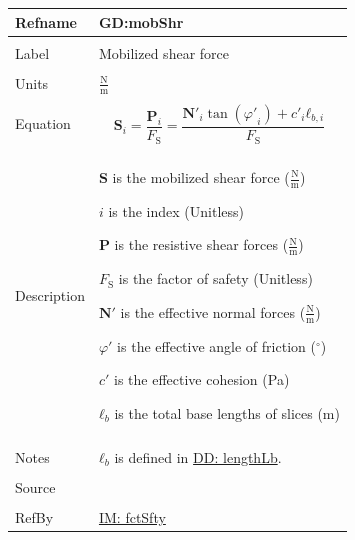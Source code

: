 \documentclass[12pt]{article}
\begin{document}
\noindent \begin{minipage}{\textwidth}
\begin{tabular}{>{\raggedright}p{}>{\raggedright\arraybackslash}p{}}
\toprule \textbf{Refname} & \textbf{GD:mobShr}
\label{GD:mobShr}
\\ \midrule \\
Label & Mobilized shear force
\\ \midrule \\
Units & $\frac{\text{N}}{\text{m}}$
\\ \midrule \\
Equation & \begin{displaymath}
           {\mathbf{S}}_{i}=\frac{{\mathbf{P}}_{i}}{{F_{\text{S}}}}=\frac{{\mathbf{N'}}_{i} \tan\left({φ'}_{i}\right)+{c'}_{i} {\mathbf{ℓ}_{b,i}}}{{F_{\text{S}}}}
           \end{displaymath}
\\ \midrule \\
Description & \begin{symbDescription}
              \item{$\mathbf{S}$ is the mobilized shear force ($\frac{\text{N}}{\text{m}}$)}
              \item{$i$ is the index (Unitless)}
              \item{$\mathbf{P}$ is the resistive shear forces ($\frac{\text{N}}{\text{m}}$)}
              \item{${F_{\text{S}}}$ is the factor of safety (Unitless)}
              \item{$\mathbf{N'}$ is the effective normal forces ($\frac{\text{N}}{\text{m}}$)}
              \item{$φ'$ is the effective angle of friction (${}^{\circ}$)}
              \item{$c'$ is the effective cohesion (Pa)}
              \item{${\mathbf{ℓ}_{b}}$ is the total base lengths of slices (m)}
              \end{symbDescription}
\\ \midrule \\
Notes & ${\mathbf{ℓ}_{b}}$ is defined in \hyperref[DD:lengthLb]{DD: lengthLb}.
\\ \midrule \\
Source & \cite{chen2005}
\\ \midrule \\
RefBy & \hyperref[IM:fctSfty]{IM: fctSfty}
\\ \bottomrule
\end{tabular}
\end{minipage}
\end{document}
